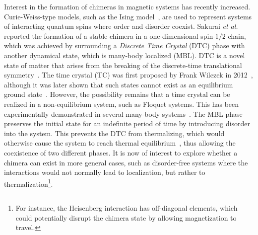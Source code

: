 \documentclass[12pt]{iopart}
\begin{document}
Interest in the formation of chimeras in magnetic systems has recently increased. Curie-Weiss-type models, such as the Ising model~\cite{singh_chimera_2011}, are used to represent systems of interacting quantum spins where order and disorder coexist. Sakurai \textit{et al.}~\cite{sakurai_phys_nodate} reported the formation of a stable chimera in a one-dimensional spin-$1/2$ chain, which was achieved by surrounding a \textit{Discrete Time Crystal} (DTC) phase with another dynamical state, which is many-body localized (MBL). DTC is a novel state of matter that arises from the breaking of the discrete-time translational symmetry~\cite{else_floquet_2016}. The time crystal (TC) was first proposed by Frank Wilczek in 2012~\cite{wilczek_quantum_2012}, although it was later shown that such states cannot exist as an equilibrium ground state~\cite{Bruno_comment_1, Bruno2013, watanabe_absence_2015}. However, the possibility remains that a time crystal can be realized in a non-equilibrium system, such as Floquet systems. This has been experimentally demonstrated in several many-body systems~\cite{huang2018,taheri_all-optical_2022, Soham2018, zhang_observation_2017, yao_time_2018,frey_realization_2022, rovny_observation_2018, sacha_time_nodate,golletz_basis_2022}. The MBL phase preserves the initial state for an indefinite period of time by introducing disorder into the system. This prevents the DTC from thermalizing, which would otherwise cause the system to reach thermal equilibrium~\cite{zhang_observation_2017,alet_many-body_2018,else_floquet_2016,smith_many-body_2016,nguyen_signature_2021}, thus allowing the coexistence of two different phases. It is now of interest to explore whether a chimera can exist in more general cases, such as disorder-free systems where the interactions would not normally lead to localization, but rather to thermalization\footnote{For instance, the Heisenberg interaction has off-diagonal elements, which could potentially disrupt the chimera state by allowing magnetization to travel.}.
\end{document}

